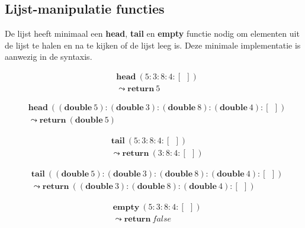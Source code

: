 \subsection{Lijst-manipulatie functies}
De lijst heeft minimaal een \textbf{head}, \textbf{tail} en \textbf{empty} functie nodig om elementen uit de lijst te halen en na te kijken of de lijst leeg is. Deze minimale implementatie is aanwezig in de syntaxis.

\begin{equation}
    \begin{split}
        & \textbf{head}\:(5:3:8:4:[\:\:]) \\
        & \leadsto \textbf{return}\:5
    \end{split}
\end{equation}

\begin{equation}
    \begin{split}
        & \textbf{head}\:((\textbf{double}\:5):(\textbf{double}\:3):(\textbf{double}\:8):(\textbf{double}\:4):[\:\:]) \\
        & \leadsto \textbf{return}\:(\textbf{double}\:5)
    \end{split}
\end{equation}

\begin{equation}
    \begin{split}
        & \textbf{tail}\:(5:3:8:4:[\:\:]) \\
        & \leadsto \textbf{return}\:(3:8:4:[\:\:])
    \end{split}
\end{equation}

\begin{equation}
    \begin{split}
        & \textbf{tail}\:((\textbf{double}\:5):(\textbf{double}\:3):(\textbf{double}\:8):(\textbf{double}\:4):[\:\:]) \\
        & \leadsto \textbf{return}\:((\textbf{double}\:3):(\textbf{double}\:8):(\textbf{double}\:4):[\:\:]) 
    \end{split}
\end{equation}

\begin{equation}
    \begin{split}
        & \textbf{empty}\:(5:3:8:4:[\:\:]) \\
        & \leadsto \textbf{return}\:false
    \end{split}
\end{equation}

